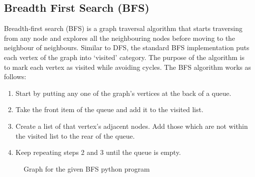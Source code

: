 \documentclass[a4paper,11pt]{book}
\begin{document}
\subsection{Breadth First Search (BFS)}

\noindent Breadth-first search (BFS) is a graph traversal algorithm that starts traversing from any node and explores all the neighbouring nodes before moving to the neighbour of neighbours. Similar to DFS, the standard BFS implementation puts each vertex of the graph into `visited' category. The purpose of the algorithm is to mark each vertex as visited while avoiding cycles. The BFS algorithm works as follows:

\begin{enumerate}
\item  Start by putting any one of the graph’s vertices at the back of a queue.
\item Take the front item of the queue and add it to the visited list.
\item Create a list of that vertex's adjacent nodes. Add those which are not within the visited list to the rear of the queue.
\item Keep repeating steps 2 and 3 until the queue is empty.
\end{enumerate}


\begin{figure}
    \centering
    \caption{Graph for the given BFS python program}
    \label{fig:graph_program_bfs}
\end{figure}
\end{document}
